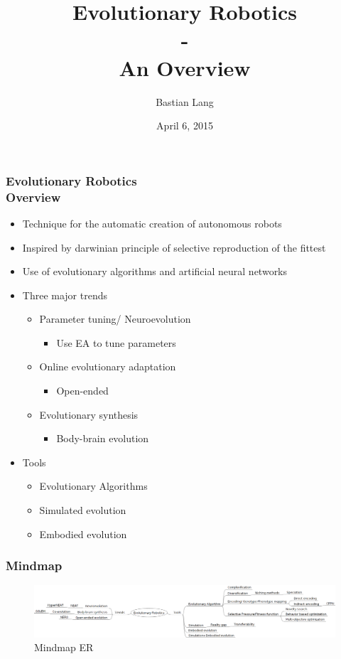 \documentclass[8pt]{beamer}
\title[Evolutionary Robotics\\An Overview]{Evolutionary Robotics\\-\\An Overview} %
\author{Bastian Lang} %
\institute[BRSU] %
{
Master of Autonomous Systems \\ %
}
\date{April 6, 2015}
\begin{document}
\listoffigures
\begin{frame}
\titlepage 
\end{frame}


\begin{frame}
\frametitle{Evolutionary Robotics\\Overview}
\begin{itemize}
\item Technique for the automatic creation of autonomous robots
\item Inspired by darwinian principle of selective reproduction of the fittest
\item Use of evolutionary algorithms and artificial neural networks
\item Three major trends
	\begin{itemize}
	\item Parameter tuning/ Neuroevolution
		\begin{itemize}
		\item Use EA to tune parameters
		\end{itemize}
	\item Online evolutionary adaptation
	\begin{itemize}
		\item Open-ended
	\end{itemize}
	\item Evolutionary synthesis
		\begin{itemize}
		\item Body-brain evolution
		\end{itemize}
	\end{itemize}

\item Tools
	\begin{itemize}
	\item Evolutionary Algorithms
	\item Simulated evolution
	\item Embodied evolution
	\end{itemize}
\end{itemize}
\end{frame}

\begin{frame}
\frametitle{Mindmap}
\begin{figure}[ht]
	\centering
  \includegraphics[width=1\textwidth]{Evolutionary_Robotics_151013.png}
	\caption{Mindmap ER}
	\label{fig1}
\end{figure}
\end{frame}
\end{document}

